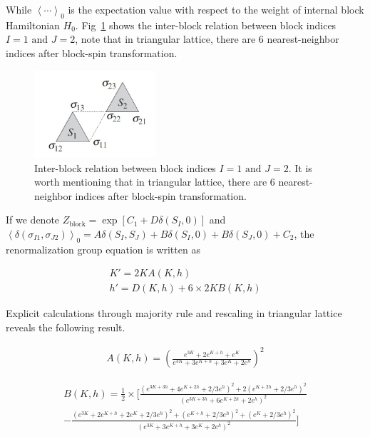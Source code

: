 \documentclass[%
 reprint,
 amsmath,amssymb,
 aps,
]{revtex4-2}
\begin{document}
While $\left<\dotsb\right>_{0}$ is the expectation value with respect to the weight of 
internal block Hamiltonian $H_{0}$. Fig~\ref{fig:intra} shows the inter-block relation 
between block indices $I=1 \text{ and } J=2$, note that in triangular lattice, 
there are 6 nearest-neighbor indices after block-spin transformation. \\

\begin{figure}[b]
\includegraphics[width=0.4\textwidth]{../fig/effective interblock interaction.JPG}
\caption{\label{fig:intra} Inter-block relation between block indices $I=1 \text{ and } J=2$.
It is worth mentioning that in triangular lattice, there are 6 nearest-neighbor indices 
after block-spin transformation.}
\end{figure}

If we denote $Z_{\text{block}} = \exp[C_{1} + D \delta(S_{I},0)]$ and 
$\left<\delta(\sigma_{I1},\sigma_{J2})\right>_{0} = A\delta(S_{I},S_{J}) + 
B\delta(S_{I},0) + B\delta(S_{J},0) + C_{2}$, the renormalization group equation is 
written as

\begin{gather}
K' = 2KA(K,h) \label{eqn:rgeq1}\\
h' = D(K,h) + 6 \times 2KB(K,h) \label{eqn:rgeq2}
\end{gather}

Explicit calculations through majority rule and rescaling in triangular lattice
reveals the following result.

\begin{align}
A(K,h) = \left(\frac{e^{3K}+2e^{K+h}+e^{K}}{e^{3K}+3e^{K+h}+3e^{K}+2e^{h}}\right)^{2}
\end{align}

\begin{widetext}
\begin{multline}
B(K,h) = \frac{1}{2} \times \Bigg[
\frac{\left(e^{3K+3h}+4e^{K+2h}+2/3e^{h}\right)^2 + 2\left(e^{K+2h}+2/3e^{h}\right)^2}
{\left(e^{3K+3h}+6e^{K+2h}+2e^{h}\right)^2}\\ 
- \frac{\left(e^{3K}+2e^{K+h}+2e^{K}+2/3e^{h}\right)^2+\left(e^{K+h}+2/3e^{h}\right)^2+
\left(e^{K}+2/3e^{h}\right)^2}
{\left(e^{3K}+3e^{K+h}+3e^{K}+2e^{h}\right)^2} \Bigg]
\end{multline}
\end{widetext}
\end{document}
